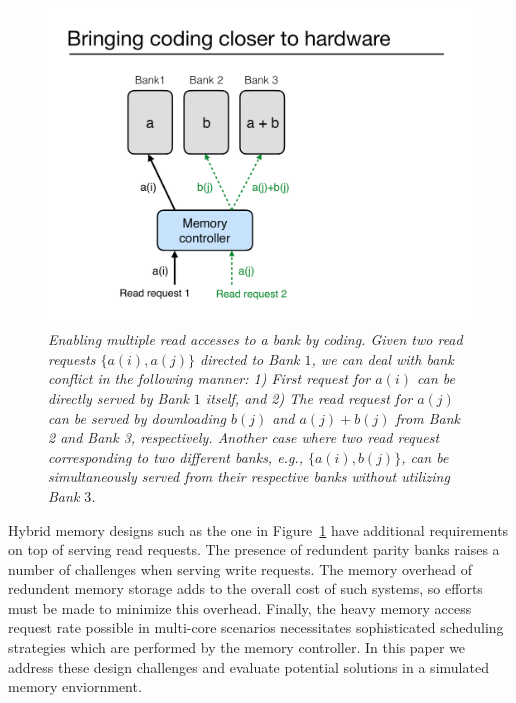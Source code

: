\begin{figure}[t!]
\centering
\includegraphics[width=0.395\linewidth]{fig/example-xor.pdf}
\caption{\it{Enabling multiple read accesses to a bank by coding. Given two read requests $\{a(i), a(j)\}$ directed to Bank $1$, we can deal with bank conflict in the following manner: 1) First request for $a(i)$ can be directly served by Bank $1$ itself, and 2) The read request for $a(j)$ can be served by downloading $b(j)$ and $a(j) + b(j)$ from Bank 2 and Bank 3, respectively. Another case where two read request corresponding to two different banks, e.g., $\{a(i), b(j)\}$, can be simultaneously served from their respective banks without utilizing Bank $3$.}}
\label{fig:example_xor}
\end{figure}
Hybrid memory designs such as the one in Figure~\ref{fig:example_xor} have additional requirements on top of serving read requests. The presence of redundent parity banks raises a number of challenges when serving write requests. The memory overhead of redundent memory storage adds to the overall cost of such systems, so efforts must be made to minimize this overhead. Finally, the heavy memory access request rate possible in multi-core scenarios necessitates sophisticated scheduling strategies which are performed by the memory controller. In this paper we address these design challenges and evaluate potential solutions in a simulated memory enviornment. 

